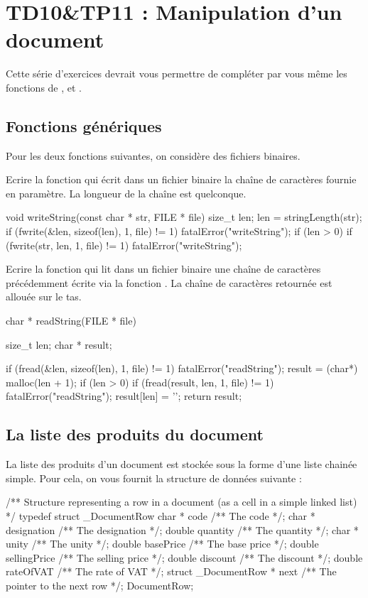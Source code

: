\chapter{TD10\&TP11 : Manipulation d'un document}

Cette série d'exercices devrait vous permettre de compléter par vous même les fonctions de ,  et  .

\section{Fonctions génériques}

Pour les deux fonctions suivantes, on considère des fichiers binaires.

Ecrire la fonction  qui écrit dans un fichier binaire la chaîne de caractères fournie en paramètre. La longueur de la chaîne est quelconque.

\begin{csourcecorrection}
void writeString(const char * str, FILE * file) {
    size_t len;
    len = stringLength(str);
    if (fwrite(&len, sizeof(len), 1, file) != 1)
        fatalError("writeString");
    if (len > 0)
        if (fwrite(str, len, 1, file) != 1)
            fatalError("writeString");
}
\end{csourcecorrection}


Ecrire la fonction  qui lit dans un fichier binaire une chaîne de caractères précédemment écrite via la fonction . La chaîne de caractères retournée est allouée sur le tas.

\begin{csourcecorrection}
char * readString(FILE * file) {
    size_t len;
    char * result;

    if (fread(&len, sizeof(len), 1, file) != 1)
        fatalError("readString");
    result = (char*) malloc(len + 1);
    if (len > 0)
        if (fread(result, len, 1, file) != 1)
            fatalError("readString");
    result[len] = '\0';
    return result;
}
\end{csourcecorrection}

\section{La liste des produits du document}

La liste des produits d'un document est stockée sous la forme d'une liste chainée simple. Pour cela, on vous fournit la structure de données suivante :
\begin{csource}
/** Structure representing a row in a document (as a cell in a simple linked list) */
typedef struct _DocumentRow {
    char * code /** The code */;
    char * designation /** The designation */;
    double quantity /** The quantity */;
    char * unity /** The unity */;
    double basePrice /** The base price */;
    double sellingPrice /** The selling price */;
    double discount /** The discount */;
    double rateOfVAT /** The rate of VAT */;
    struct _DocumentRow * next /** The pointer to the next row */;
} DocumentRow;
\end{csource}

